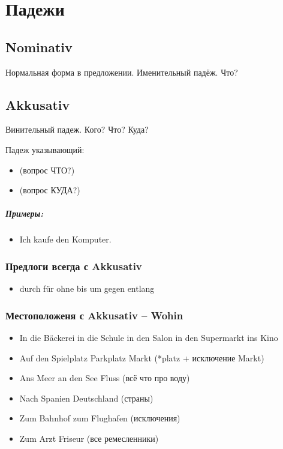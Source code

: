 \chapter{Падежи}

\section{Nominativ}

Нормальная форма в предложении. Именительный падёж. Что?

\section{Akkusativ}

Винительный падеж. Кого? Что? Куда?

Падеж указывающий:
\begin{itemize}
 \item {} (вопрос ЧТО?)
 \item {} (вопрос КУДА?)
\end{itemize}

\paragraph{Примеры:}
\begin{itemize}
\item Ich kaufe den Komputer.
~\\ 
\end{itemize}

\subsection{Предлоги всегда с Akkusativ}
\begin{itemize}
\item  durch für ohne bis um gegen entlang
\end{itemize}

\subsection{Местоположеня с Akkusativ -- Wohin}
\begin{itemize}
    \item In die Bäckerei in die Schule in den Salon in den Supermarkt ins Kino
    \item Auf den Spielplatz Parkplatz Markt (*platz + исключение Markt)
    \item Ans Meer an den See Fluss (всё что про воду)
    \item Nach Spanien Deutschland (страны)
    \item Zum Bahnhof zum Flughafen (исключения)
    \item Zum Arzt Friseur (все ремесленники)
\end{itemize}

